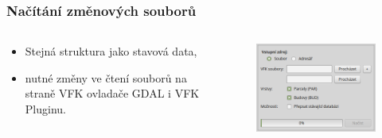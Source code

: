 \documentclass{beamer}
\begin{document}
\begin{frame}
\frametitle{Načítání změnových souborů}

\begin{columns}%

  \begin{column}{0.5\textwidth}

    \begin{itemize}
    \item Stejná struktura jako stavová data,
    \item nutné změny ve čtení souborů na straně VFK ovladače GDAL i VFK Pluginu.
    \end{itemize}
  
  \end{column}
  
  \begin{column}{0.5\textwidth}
  
    \begin{figure}
      \includegraphics[width=.9\textwidth]{images/vfkPlugin-nacitani.png}
    \end{figure}
    
  \end{column}

\end{columns}

\end{frame}

\end{document}
